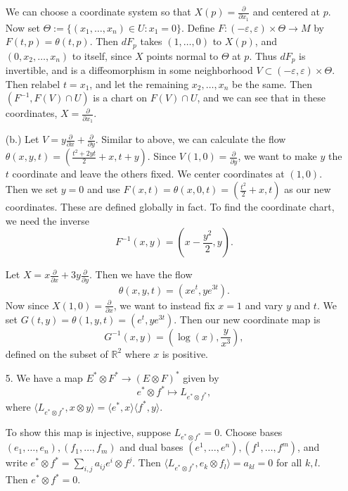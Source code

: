 \documentclass[11pt, reqno]{article}
\theoremstyle{plain}
\theoremstyle{definition}
\theoremstyle{remark}
\renewcommand{\epsilon}{\varepsilon}
\newcommand{\RR}{\mathbb{R}}
\begin{document}
\begin{enumerate}
    We can choose a coordinate system so that $X(p) = \frac{\partial}{\partial x_1}$ and centered at $p$. Now set 
    $\Theta := \{(x_1, \dots, x_n) \in U: x_1 = 0\}$. Define $F: (-\epsilon, \epsilon)\times \Theta \to M$ 
    by $F(t,p) = \theta(t,p)$. Then $dF_p$ takes $(1,\dots, 0)$ to $X(p)$, and $(0, x_2,\dots, x_n)$
    to itself, since $X$ points normal to $\Theta$ at $p$. Thus $dF_p$ is invertible, and 
    is a diffeomorphism in some neighborhood $V \subset (-\epsilon,\epsilon)\times \Theta$. Then relabel $t = x_1$, and let
    the remaining $x_2, \dots, x_n$ be the same. Then $(F^{-1}, F(V)\cap U)$ is a chart on $F(V)\cap U$,
    and we can see that in these coordinates, $X = \frac{\partial}{\partial x_1}$. 

    (b.) Let $V = y \frac{\partial}{\partial x} + \frac{\partial}{\partial y}$. Similar to above, we can
    calculate the flow $\theta(x,y,t) = (\frac{t^2 + 2yt}{2} + x, t + y)$. Since $V(1,0) = \frac{\partial}{\partial y}$,
    we want to make $y$ the $t$ coordinate and leave the others fixed. We center coordinates at $(1,0)$. Then
    we set $y = 0$ and use $F(x,t) = \theta(x, 0, t) = (\frac{t^2}{2} + x, t)$ as our new coordinates. These
    are defined globally in fact. To find the coordinate chart, we need the inverse 
    \[
        F^{-1}(x,y) = (x - \frac{y^2}{2}, y).
    \]

    Let $X = x \frac{\partial}{\partial x} + 3y \frac{\partial}{\partial y}$. Then we have the flow
    \[
        \theta(x,y,t) = (xe^t, ye^{3t}).
    \]
    Now since $X(1,0) = \frac{\partial}{\partial x}$, we want to instead fix $x = 1$ and vary $y$ and $t$. 
    We set $G(t,y) = \theta(1, y, t) = (e^t, ye^{3t})$. Then our new coordinate map is 
    \[
        G^{-1}(x,y) = (\log(x), \frac{y}{x^3}),
    \]
    defined on the subset of $\RR^2$ where $x$ is positive. 

    \item[5.] We have a map $E^* \otimes F^* \to (E\otimes F)^*$ given by 
    \[
        e^*\otimes f^* \mapsto L_{e^* \otimes f^*},
    \]
    where $\langle L_{e^* \otimes f^*},x\otimes y\rangle = \langle e^*, x\rangle\langle f^*, y\rangle$.

    To show this map is injective, suppose $L_{e^*\otimes f^*} = 0$. Choose bases $(e_1,\dots, e_n),
    (f_1, \dots, f_m)$ and dual bases $(e^1, \dots, e^n), (f^1, \dots, f^m)$, and write
    $e^*\otimes f^* = \sum_{i,j} a_{ij}e^i\otimes f^j$. Then $\langle L_{e^* \otimes f^*}, e_k\otimes f_l\rangle
    = a_{kl} = 0$ for all $k,l$. Then $e^*\otimes f^* = 0$. 


\end{enumerate}
\end{document}

